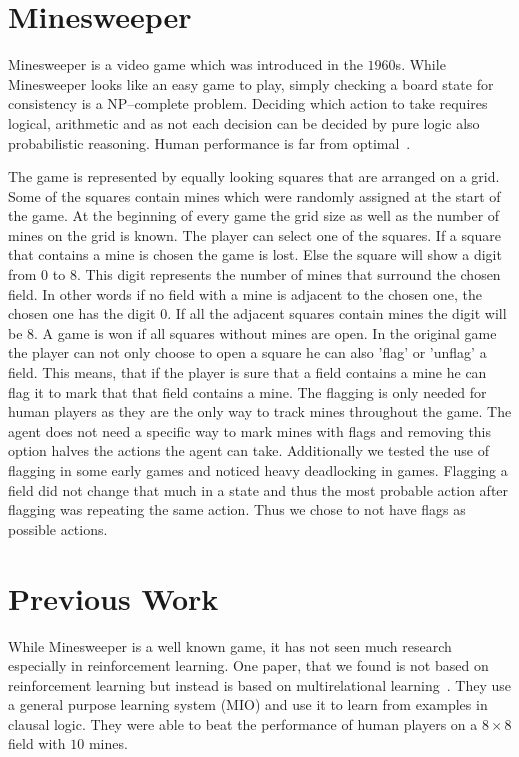 \section{Minesweeper}
Minesweeper is a video game which was introduced in the $1960$s. 
While Minesweeper looks like an easy game to play, simply checking a board state for consistency is a NP--complete problem.
Deciding which action to take requires logical, arithmetic and as not each decision can be decided by pure logic also probabilistic reasoning.
Human performance is far from optimal~\cite{castillo2003learning}.

The game is represented by equally looking squares that are arranged on a grid. 
Some of the squares contain mines which were randomly assigned at the start of the game. 
At the beginning of every game the grid size as well as the number of mines on the grid is known.
The player can select one of the squares. 
If a square that contains a mine is chosen the game is lost.
Else the square will show a digit from $0$ to $8$.
This digit represents the number of mines that surround the chosen field.
In other words if no field with a mine is adjacent to the chosen one, the chosen one has the digit $0$. 
If all the adjacent squares contain mines the digit will be $8$.
A game is won if all squares without mines are open.
In the original game the player can not only choose to open a square he can also 'flag' or 'unflag' a field.
This means, that if the player is sure that a field contains a mine he can flag it to mark that that field contains a mine.
The flagging is only needed for human players as they are the only way to track mines throughout the game.
The agent does not need a specific way to mark mines with flags and removing this option halves the actions the agent can take.
Additionally we tested the use of flagging in some early games and noticed heavy deadlocking in games.
Flagging a field did not change that much in a state and thus the most probable action after flagging was repeating the same action.
Thus we chose to not have flags as possible actions.

\section{Previous Work}
While Minesweeper is a well known game, it has not seen much research especially in reinforcement learning.
One paper, that we found is not based on reinforcement learning but instead is based on multirelational learning~\cite{castillo2003learning}.
They use a general purpose learning system (MIO) and use it to learn from examples in clausal logic.
They were able to beat the performance of human players on a $8\times8$ field with $10$ mines.